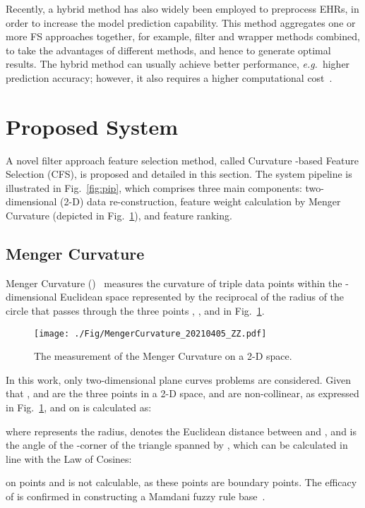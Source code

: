 \documentclass{article}
\newcommand{\zzeg}{\emph{e.g.}~}
\newcommand*{\1}{\textcolor{magenta}}
\begin{document}
	Recently, a hybrid method has also widely been employed to preprocess EHRs, in order to increase the model prediction capability. This method aggregates one or more FS approaches together, for example, filter and wrapper methods combined, to take the advantages of different methods, and hence to generate optimal results. The hybrid method can usually achieve better performance, \zzeg higher prediction accuracy; however, it also requires a higher computational cost~\cite{jain2018feature}. 
	
	\section{Proposed System} \label{sec:appr}
	A novel filter approach feature selection method, called Curvature -based Feature Selection (CFS), is proposed and detailed in this section. The system pipeline is illustrated in Fig.~\ref{fig:pip}, which comprises three main components: two-dimensional (2-D) data re-construction, feature weight calculation by Menger Curvature (depicted in Fig.~\ref{fig:mengercurvature}), and feature ranking. 
	
	\subsection{Menger Curvature}\label{sec:RoC}
	Menger Curvature ()~\cite{leger1999menger} measures the curvature of triple data points within the -dimensional Euclidean space  represented by the reciprocal of the radius of the circle that passes through the three points , , and  in Fig.~\ref{fig:mengercurvature}.
	\begin{figure}[!ht]
		\centering
		\texttt{[image: ./Fig/MengerCurvature\_20210405\_ZZ.pdf]}
		\caption{The measurement of the Menger Curvature on a 2-D space.}
		\label{fig:mengercurvature}
	\end{figure}
	
	In this work, only two-dimensional plane curves problems are considered. Given that , and  are the three points in a 2-D space,  and  are non-collinear, as expressed in Fig.~\ref{fig:mengercurvature}, and  on  is calculated as:
	
	
	where  represents the radius,  denotes the Euclidean distance between  and , and   is the angle of the -corner of the triangle spanned by , which can be calculated in line with the Law of Cosines:
	
	 on points  and  is not calculable, as these points are boundary points. The efficacy of  is confirmed in constructing a Mamdani fuzzy rule base~\cite{zuo2020CSRBG}.
	
\end{document}
